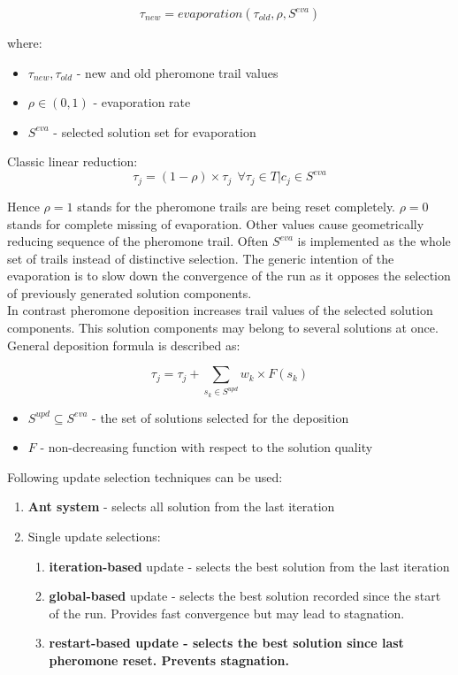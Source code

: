 \documentclass[12pt]{article}
\begin{document}
\begin{equation}
\tau_{new}=evaporation(\tau_{old}, \rho, S^{eva})
\end{equation}

where:
\begin{itemize}
\item $\tau_{new}, \tau_{old}$ - new and old pheromone trail values
\item $\rho \in (0,1)$ - evaporation rate
\item $S^{eva}$ - selected solution set for evaporation
\end{itemize}

Classic linear reduction:
\begin{equation}
\tau_j = (1-\rho) \times \tau_j \ \ \forall  \tau_j \in T | c_j \in S^{eva}
\end{equation}

Hence $\rho=1$ stands for the pheromone trails are being reset completely. $\rho=0$ stands for complete missing of evaporation. Other values cause geometrically reducing sequence of the pheromone trail. Often $S^{eva}$ is implemented as the whole set of trails instead of distinctive selection. The generic intention of the evaporation is to slow down the convergence of the run as it opposes the selection of previously generated solution components. \\

In contrast pheromone deposition increases trail values of the selected solution components. This solution components may belong to several solutions at once. General deposition formula is described as:

\begin{equation}
\tau_j = \tau_j + \sum \limits_{s_k \in S^{upd}} w_k \times F(s_k)
\end{equation} 

\begin{itemize}
\item $S^{upd} \subseteq S^{eva}$ - the set of solutions selected for the deposition
\item $F$ - non-decreasing function with respect to the solution quality
\end{itemize}

Following update selection techniques can be used:
\begin{enumerate}
\item {\textbf{Ant system} - selects all solution from the last iteration}
\item {Single update selections:}
\begin{enumerate}
\item {\textbf{iteration-based} update - selects the best solution from the last iteration}
\item {\textbf{global-based} update - selects the best solution recorded since the start of the run. Provides fast convergence but may lead to stagnation.}
\item \textbf{{restart-based} update - selects the best solution since last pheromone reset. Prevents stagnation.}
\end{enumerate}
\end{enumerate}
\end{document}
